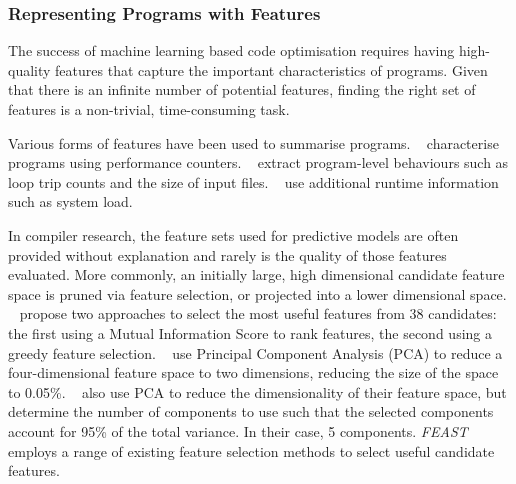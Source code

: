 \subsubsection{Representing Programs with Features}

The success of machine learning based code optimisation requires having high-quality features that capture the important characteristics of programs. Given that there is an infinite number of potential features, finding the right set of features is a non-trivial, time-consuming task.

Various forms of features have been used to summarise programs.
\citeauthor{Dubach2009}~\cite{Dubach2009} characterise programs using performance counters.
\citeauthor{Jiang2010}~\cite{Jiang2010} extract program-level behaviours such as loop trip counts and the size of input files.
\citeauthor{Berral2010a}~\cite{Berral2010a} use additional runtime information such as system load.

In compiler research, the feature sets used for predictive models are often provided without explanation and rarely is the quality of those features evaluated. More commonly, an initially large, high dimensional candidate feature space is pruned via feature selection, or projected into a lower dimensional space.
\citeauthor{Stephenson2005}~\cite{Stephenson2005} propose two approaches to select the most useful features from 38 candidates: the first using a Mutual Information Score to rank features, the second using a greedy feature selection.
\citeauthor{Collins2013}~\cite{Collins2013} use Principal Component Analysis (PCA) to reduce a four-dimensional feature space to two dimensions, reducing the size of the space to 0.05\%.
\citeauthor{Dubach2007}~\cite{Dubach2007} also use PCA to reduce the dimensionality of their feature space, but determine the number of components to use such that the selected components account for 95\% of the total variance. In their case, 5 components.
\emph{FEAST}~\cite{Ting2016} employs a range of existing feature selection methods to select useful candidate features.

